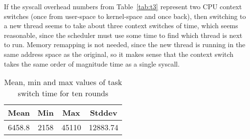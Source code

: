 If the syscall overhead numbers from Table~\ref{tab:t3} represent two
CPU context switches (once from user-space to kernel-space and once
back), then switching to a new thread seems to take about three
context switches of time, which seems reasonable, since the scheduler
must use some time to find which thread is next to run.
%
Memory remapping is not needed, since the new thread is running in the
same address space as the original, so it makes sense that the context
switch takes the same order of magnitude time as a single syscall.
%


\begin{table}[htb]

    \caption{Mean, min and max values of task switch time for ten rounds}
 
\begin{tabular}{|c|c|c|c|} 
    \hline
    Mean & Min & Max & Stddev\\ 
    \hline
    6458.8 & 2158 & 45110 & 12883.74\\ 
    \hline
   \end{tabular}
    \label{tab:t5}
\end{table}
